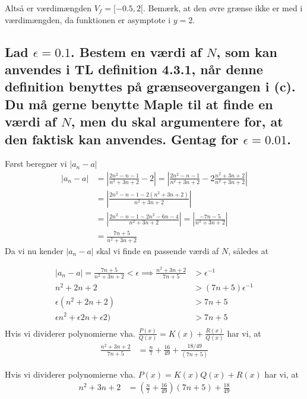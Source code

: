 \documentclass[11pt,a4paper]{article}
\newcommand{\modulus}[1]{\lvert#1\rvert}
\begin{document}
Altså er værdimængden $V_f = [-0.5,2[$. Bemærk, at den øvre grænse ikke er
med i værdimængden, da funktionen er asymptote i $y = 2$.

\subsection{\mdseries Lad $\epsilon = 0.1$. Bestem en værdi af $N$, som kan
    anvendes i TL definition 4.3.1, når denne definition benyttes på
    grænseovergangen i (c). Du må gerne benytte Maple til at finde en værdi
    af $N$, men du skal argumentere for, at den faktisk kan anvendes. Gentag
    for $\epsilon = 0.01$.}
Først beregner vi $\modulus{a_n - a}$
\begin{align}
    |a_n - a| &= \left| \frac{2n^2 - n - 1}{n^2 + 3n + 2} - 2 \right|
               = \left| \frac{2n^2 - n - 1}{n^2 + 3n + 2} - 2
                        \frac{n^2 + 3n + 2}{n^2 + 3n + 2} \right| \\
              &= \left| \frac{2n^2 - n - 1 - 2(n^2 + 3n + 2)}
                             {n^2 + 3n + 2} \right| \\
              &= \left| \frac{2n^2 - n - 1 - 2n^2 - 6n - 4}
                             {n^2 + 3n + 2} \right|
               = \left| \frac{-7n - 5}{n^2 + 3n + 2} \right| \\
              &= \frac{7n + 5}{n^2 + 3n + 2}
\end{align}
Da vi nu kender $\modulus{a_n - a}$ skal vi finde en passende værdi af $N$,
således at

\iffalse

\begin{align}
    \modulus{a_n - a} = \frac{7n + 5}{n^2 + 3n + 2} < \epsilon \implies
    \frac{n^2 + 3n + 2}{7n + 5} &> \epsilon^{-1} \\
    n^2 + 2n + 2 &> (7n + 5) \epsilon^{-1} \\
    \epsilon(n^2 + 2n + 2) &> 7n + 5 \\
    \epsilon n^2 + \epsilon 2n + \epsilon 2) &> 7n + 5 \\
\end{align}
Hvis vi dividerer polynomierne vha. $\frac{P(x)}{Q(x)} = K(x) +
\frac{R(x)}{Q(x)}$ har vi, at
\begin{align}
    \frac{n^2 + 3n + 2}{7n + 5}
    &= \frac{n}{7} + \frac{16}{49} + \frac{18 / 49}{(7n + 5)}
\end{align}

Hvis vi dividerer polynomierne vha. $P(x) = K(x) Q(x) + R(x)$ har vi, at
\begin{align}
    n^2 + 3n + 2 &= \left( \frac{n}{7} + \frac{16}{49} \right)
                    \left( 7n + 5 \right)
                  + \frac{18}{49}
\end{align}
\end{document}
